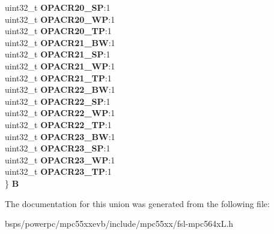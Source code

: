 \begin{DoxyCompactItemize}
\begin{tabbing}
\>uint32\_t {\bfseries OPACR20\_SP}:1\\
\>uint32\_t {\bfseries OPACR20\_WP}:1\\
\>uint32\_t {\bfseries OPACR20\_TP}:1\\
\>uint32\_t {\bfseries OPACR21\_BW}:1\\
\>uint32\_t {\bfseries OPACR21\_SP}:1\\
\>uint32\_t {\bfseries OPACR21\_WP}:1\\
\>uint32\_t {\bfseries OPACR21\_TP}:1\\
\>uint32\_t {\bfseries OPACR22\_BW}:1\\
\>uint32\_t {\bfseries OPACR22\_SP}:1\\
\>uint32\_t {\bfseries OPACR22\_WP}:1\\
\>uint32\_t {\bfseries OPACR22\_TP}:1\\
\>uint32\_t {\bfseries OPACR23\_BW}:1\\
\>uint32\_t {\bfseries OPACR23\_SP}:1\\
\>uint32\_t {\bfseries OPACR23\_WP}:1\\
\>uint32\_t {\bfseries OPACR23\_TP}:1\\
\} {\bfseries B}\\

\end{tabbing}\end{DoxyCompactItemize}


The documentation for this union was generated from the following file\+:\begin{DoxyCompactItemize}
\item 
bsps/powerpc/mpc55xxevb/include/mpc55xx/fsl-\/mpc564x\+L.\+h\end{DoxyCompactItemize}

